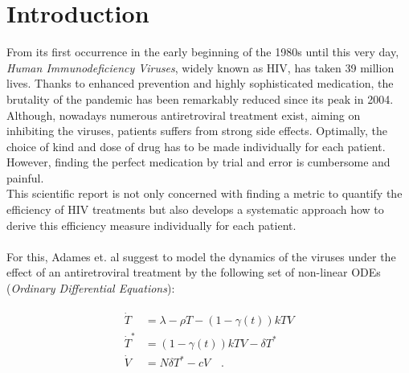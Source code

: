\section{Introduction}
\label{sec:Introduction}

From its first occurrence in the early beginning of the 1980s until this very day, \textit{Human Immunodeficiency Viruses}, widely known as HIV, has taken 39 million lives.
Thanks to enhanced prevention and highly sophisticated medication, the brutality of the pandemic has been remarkably reduced since its peak in 2004.
Although, nowadays numerous antiretroviral treatment exist, aiming on inhibiting the viruses, patients suffers from strong side effects.
Optimally, the choice of kind and dose of drug has to be made individually for each patient.
However, finding the perfect medication by trial and error is cumbersome and painful.\\
This scientific report is not only concerned with finding a metric to quantify the efficiency of HIV treatments but also develops a systematic approach how to derive this efficiency measure individually for each patient.\\ \\
For this, Adames et. al \cite{ADAMS200510} suggest to model the dynamics of the viruses under the effect of an antiretroviral treatment by the following set of non-linear ODEs (\textit{Ordinary Differential Equations}): 

\begin{align}
    \begin{split}
        \dot{T} &= \lambda - \rho T - (1 - \gamma(t))kTV\\
        \dot{T}^{*} &= (1-\gamma(t))kTV-\delta T^{*}\\
        \dot{V} &= N\delta T^{*}-cV \quad \text{.}
    \end{split}
    \label{equ:ODEs}
\end{align}

